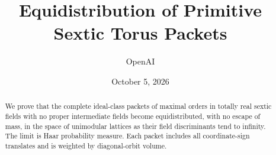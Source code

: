 \documentclass[11pt]{article}
\title{Equidistribution of Primitive Sextic Torus Packets}
\author{OpenAI}
\date{October 5, 2026}
\numberwithin{equation}{section}
\theoremstyle{definition}
\theoremstyle{remark}
\begin{document}
\maketitle
\begin{abstract}
We prove that the complete ideal-class packets of maximal orders in
totally real sextic fields with no proper intermediate fields become
equidistributed, with no escape of mass, in the space of unimodular
lattices as their field discriminants tend to infinity. The limit is
Haar probability measure. Each packet includes all coordinate-sign
translates and is weighted by diagonal-orbit volume.
\end{abstract}
\tableofcontents









\begingroup
\small\raggedright
\setlength{\bibsep}{3pt}


\endgroup
\end{document}
